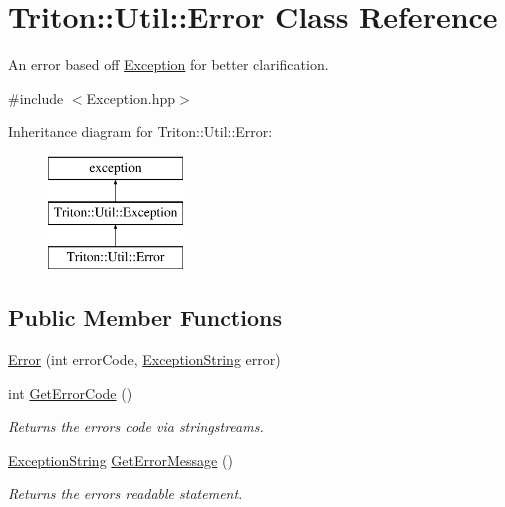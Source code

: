 \hypertarget{class_triton_1_1_util_1_1_error}{}\section{Triton\+:\+:Util\+:\+:Error Class Reference}
\label{class_triton_1_1_util_1_1_error}


An error based off \hyperlink{class_triton_1_1_util_1_1_exception}{Exception} for better clarification.  




{\ttfamily \#include $<$Exception.\+hpp$>$}

Inheritance diagram for Triton\+:\+:Util\+:\+:Error\+:\begin{figure}[H]
\begin{center}
\leavevmode
\includegraphics[height=3.000000cm]{class_triton_1_1_util_1_1_error}
\end{center}
\end{figure}
\subsection*{Public Member Functions}
\begin{DoxyCompactItemize}
\item 
\hyperlink{class_triton_1_1_util_1_1_error_a30e30a2532494d24964293e8ef664d32}{Error} (int error\+Code, \hyperlink{namespace_triton_1_1_util_a7e55ae91d6ccf98a52870cf7b7648eb7}{Exception\+String} error)
\item 
int \hyperlink{class_triton_1_1_util_1_1_error_ab72ec1bb13ec5e722542e82f0dbc553d}{Get\+Error\+Code} ()
\begin{DoxyCompactList}\small\item\em Returns the error\textquotesingle{}s code via stringstreams. \end{DoxyCompactList}\item 
\hyperlink{namespace_triton_1_1_util_a7e55ae91d6ccf98a52870cf7b7648eb7}{Exception\+String} \hyperlink{class_triton_1_1_util_1_1_error_a4d00634dc399c620eac99dc2c4ba5d3c}{Get\+Error\+Message} ()
\begin{DoxyCompactList}\small\item\em Returns the error\textquotesingle{}s readable statement. \end{DoxyCompactList}\end{DoxyCompactItemize}
